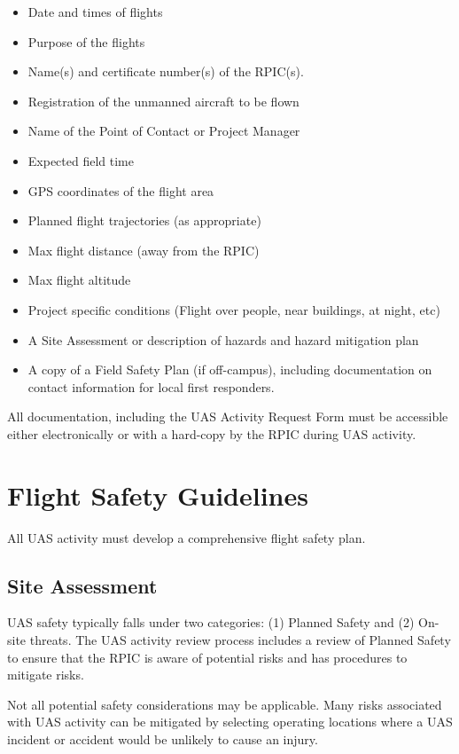\documentclass[
]{book}
\providecommand{\tightlist}{%
  \setlength{\itemsep}{0pt}\setlength{\parskip}{0pt}}
\begin{document}
\begin{itemize}
\tightlist
\item
  Date and times of flights
\item
  Purpose of the flights
\item
  Name(s) and certificate number(s) of the RPIC(s).
\item
  Registration of the unmanned aircraft to be flown
\item
  Name of the Point of Contact or Project Manager
\item
  Expected field time
\item
  GPS coordinates of the flight area
\item
  Planned flight trajectories (as appropriate)
\item
  Max flight distance (away from the RPIC)
\item
  Max flight altitude
\item
  Project specific conditions (Flight over people, near buildings, at night, etc)
\item
  A Site Assessment or description of hazards and hazard mitigation plan
\item
  A copy of a Field Safety Plan (if off-campus), including documentation on contact information for local first responders.
\end{itemize}

All documentation, including the UAS Activity Request Form must be accessible either electronically or with a hard-copy by the RPIC during UAS activity.

\hypertarget{ch-flight-safety}{%
\chapter{Flight Safety Guidelines}\label{ch-flight-safety}}

All UAS activity must develop a comprehensive flight safety plan.

\hypertarget{site-assessment}{%
\section{Site Assessment}\label{site-assessment}}

UAS safety typically falls under two categories: (1) Planned Safety and (2) On-site threats. The UAS activity review process includes a review of Planned Safety to ensure that the RPIC is aware of potential risks and has procedures to mitigate risks.

Not all potential safety considerations may be applicable. Many risks associated with UAS activity can be mitigated by selecting operating locations where a UAS incident or accident would be unlikely to cause an injury.
\end{document}
